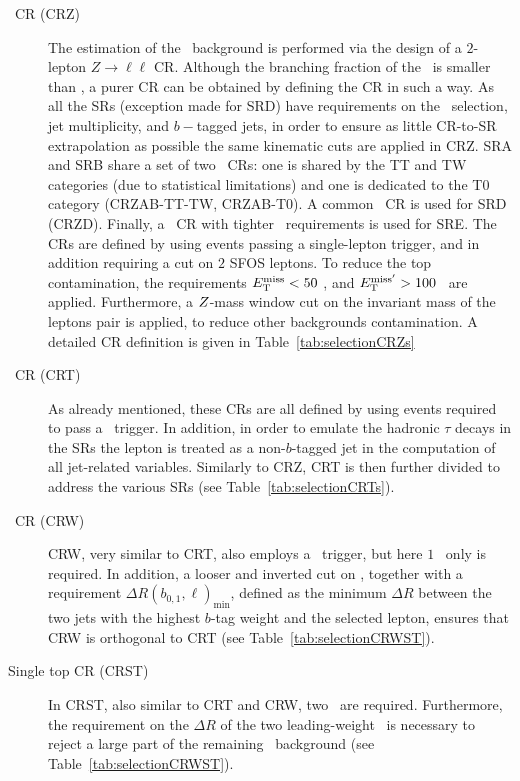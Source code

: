 			\begin{description}

				\item [\Zjets\ CR (CRZ)] The estimation of the \Znunu\ background is performed via the design of a $2$-lepton $Z \rightarrow \ell \ell$ \ac{CR}. Although the branching fraction of the \Zll\ is smaller than \Znunu, a purer \ac{CR} can be obtained by defining the \ac{CR} in such a way. As all the \acp{SR} (exception made for SRD) have requirements on the \MET\ selection, jet multiplicity, and $b-$tagged jets, in order to ensure as little \ac{CR}-to-\ac{SR} extrapolation as possible the same kinematic cuts are applied in CRZ. SRA and SRB share a set of two \Zboson\ \acp{CR}: one is shared by the TT and TW categories (due to statistical limitations) and one is dedicated to the T0 category (CRZAB-TT-TW, CRZAB-T0). A common \Zboson\ \ac{CR} is used for SRD (CRZD). Finally, a \Zboson\ \ac{CR} with tighter \HT\ requirements is used for SRE. The \acp{CR} are defined by using events passing a single-lepton trigger, and in addition requiring a cut on $2$ \acl{SFOS} leptons. To reduce the top contamination, the requirements $E_{\mathrm{T}}^{\mathrm{miss}} < 50$ \GeV, and  $E_{\mathrm{T}}^{\mathrm{miss'}} > 100$ \GeV\ are applied. Furthermore, a $Z$-mass window cut on the invariant mass of the leptons pair is applied, to reduce other backgrounds contamination. A detailed \ac{CR} definition is given in Table~\ref{tab:selectionCRZs}

		
				\item [\ttbar\ CR (CRT)] As already mentioned, these \acp{CR} are all defined by using events required to pass a \met\ trigger. In addition, in order to emulate the hadronic $\tau$ decays in the \acp{SR} the lepton is treated as a non-$b$-tagged jet in the computation of all jet-related variables. Similarly to CRZ, CRT is then further divided to address the various \acp{SR} (see Table~\ref{tab:selectionCRTs}).

				\item [\Wjets\ CR (CRW)] CRW, very similar to CRT, also employs a \met\ trigger, but here $1$ \bj\ only is required. In addition, a looser and inverted cut on \mantikttwelvezero, together with a requirement $\Delta R(b_{0,1},\ell)_{\mathrm{min}}$, defined as the minimum $\Delta R$ between the two jets with the highest $b$-tag weight and the selected lepton, ensures that CRW is orthogonal to CRT (see Table~\ref{tab:selectionCRWST}). 

				\item [Single top CR (CRST)] In CRST, also similar to CRT and CRW, two \bjs\ are required. Furthermore, the requirement on the $\Delta R$ of the two leading-weight \bjs\ is necessary to reject a large part of the remaining \ttbar\ background (see Table~\ref{tab:selectionCRWST}).
			\end{description}

